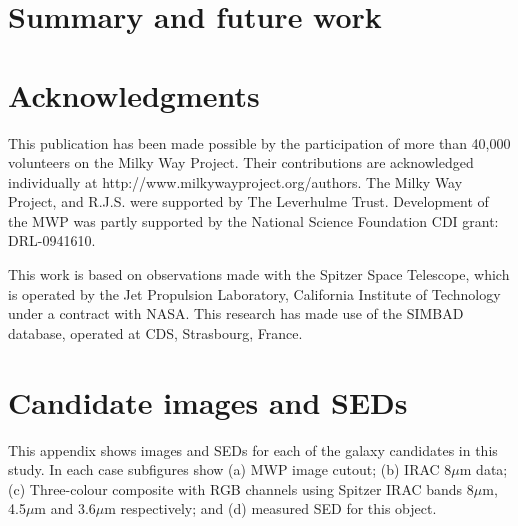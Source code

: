 \documentclass[times,usenatbib]{mn2e}
\begin{document}
\section{Summary and future work}

\section*{Acknowledgments}

This publication has been made possible by the participation of more than 40,000 volunteers on the Milky Way Project. Their contributions are acknowledged individually at http://www.milkywayproject.org/authors. The Milky Way Project, and R.J.S. were supported by The Leverhulme Trust. Development of the MWP was partly supported by the National Science Foundation CDI grant: DRL-0941610. 

This work is based on observations made with the Spitzer Space Telescope, which is operated by the Jet Propulsion Laboratory, California Institute of Technology under a contract with NASA. This research has made use of the SIMBAD database, operated at CDS, Strasbourg, France.




\clearpage


\section{Candidate images and SEDs}

This appendix shows images and SEDs for each of the galaxy candidates in this study. In each case subfigures show (a) MWP image cutout; (b) IRAC 8$\mu$m data; (c) Three-colour composite with RGB channels using Spitzer IRAC bands 8$\mu$m, 4.5$\mu$m and 3.6$\mu$m respectively; and (d) measured SED for this object.
\end{document}
